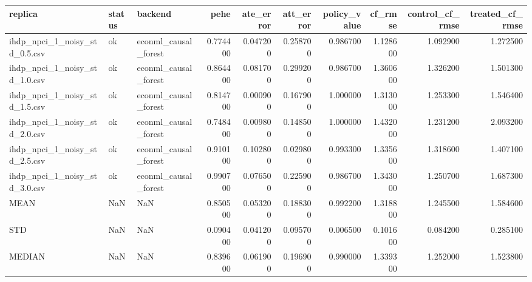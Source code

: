 \begin{tabular}{lllrrrrrrr}
\toprule
replica & status & backend & pehe & ate_error & att_error & policy_value & cf_rmse & control_cf_rmse & treated_cf_rmse \\
\midrule
ihdp_npci_1_noisy_std_0.5.csv & ok & econml_causal_forest & 0.774400 & 0.047200 & 0.258700 & 0.986700 & 1.128600 & 1.092900 & 1.272500 \\
ihdp_npci_1_noisy_std_1.0.csv & ok & econml_causal_forest & 0.864400 & 0.081700 & 0.299200 & 0.986700 & 1.360600 & 1.326200 & 1.501300 \\
ihdp_npci_1_noisy_std_1.5.csv & ok & econml_causal_forest & 0.814700 & 0.000900 & 0.167900 & 1.000000 & 1.313000 & 1.253300 & 1.546400 \\
ihdp_npci_1_noisy_std_2.0.csv & ok & econml_causal_forest & 0.748400 & 0.009800 & 0.148500 & 1.000000 & 1.432000 & 1.231200 & 2.093200 \\
ihdp_npci_1_noisy_std_2.5.csv & ok & econml_causal_forest & 0.910100 & 0.102800 & 0.029800 & 0.993300 & 1.335600 & 1.318600 & 1.407100 \\
ihdp_npci_1_noisy_std_3.0.csv & ok & econml_causal_forest & 0.990700 & 0.076500 & 0.225900 & 0.986700 & 1.343000 & 1.250700 & 1.687300 \\
MEAN & NaN & NaN & 0.850500 & 0.053200 & 0.188300 & 0.992200 & 1.318800 & 1.245500 & 1.584600 \\
STD & NaN & NaN & 0.090400 & 0.041200 & 0.095700 & 0.006500 & 0.101600 & 0.084200 & 0.285100 \\
MEDIAN & NaN & NaN & 0.839600 & 0.061900 & 0.196900 & 0.990000 & 1.339300 & 1.252000 & 1.523800 \\
\bottomrule
\end{tabular}
